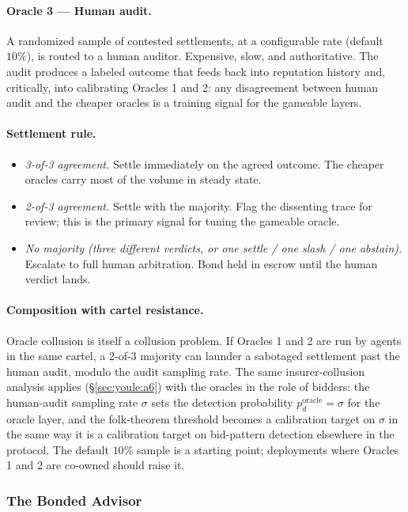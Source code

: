 \documentclass[11pt,a4paper]{article}
\theoremstyle{definition}
\theoremstyle{remark}
\begin{document}
\paragraph{Oracle 3 --- Human audit.}
A randomized sample of contested settlements, at a configurable rate (default $10\%$), is routed to a human auditor. Expensive, slow, and authoritative. The audit produces a labeled outcome that feeds back into reputation history and, critically, into calibrating Oracles 1 and 2: any disagreement between human audit and the cheaper oracles is a training signal for the gameable layers.

\paragraph{Settlement rule.}
\begin{itemize}[nosep]
  \item \emph{3-of-3 agreement.} Settle immediately on the agreed outcome. The cheaper oracles carry most of the volume in steady state.
  \item \emph{2-of-3 agreement.} Settle with the majority. Flag the dissenting trace for review; this is the primary signal for tuning the gameable oracle.
  \item \emph{No majority (three different verdicts, or one settle / one slash / one abstain).} Escalate to full human arbitration. Bond held in escrow until the human verdict lands.
\end{itemize}

\paragraph{Composition with cartel resistance.}
Oracle collusion is itself a collusion problem. If Oracles 1 and 2 are run by agents in the same cartel, a 2-of-3 majority can launder a sabotaged settlement past the human audit, modulo the audit sampling rate. The same insurer-collusion analysis applies (\S\ref{sec:youle:a6}) with the oracles in the role of bidders: the human-audit sampling rate $\sigma$ sets the detection probability $p_d^{\text{oracle}} = \sigma$ for the oracle layer, and the folk-theorem threshold becomes a calibration target on $\sigma$ in the same way it is a calibration target on bid-pattern detection elsewhere in the protocol. The default $10\%$ sample is a starting point; deployments where Oracles 1 and 2 are co-owned should raise it.

\subsubsection{The Bonded Advisor}\label{sec:bonded-advisor}
\end{document}
